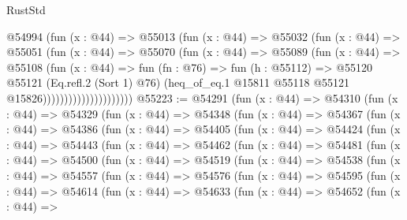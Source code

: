 \begin{lexlean}{RustStd}
\begin{coremodule}
                            @54994
                              (fun (x : @44) =>
                              @55013
                                (fun (x : @44) =>
                                @55032
                                  (fun (x : @44) =>
                                  @55051
                                    (fun (x : @44) =>
                                    @55070
                                      (fun (x : @44) =>
                                      @55089
                                        (fun (x : @44) =>
                                        @55108
                                          (fun (x : @44) =>
                                          fun (fn : @76) =>
                                          fun (h : @55112) =>
                                          @55120
                                            @55121
                                            (Eq.refl.{2} (Sort 1) @76)
                                            (heq_of_eq.{1}
                                              @15811
                                              @55118
                                              @55121
                                              @15826)))))))))))))))))))))
@55223 := @54291
    (fun (x : @44) =>
    @54310
      (fun (x : @44) =>
      @54329
        (fun (x : @44) =>
        @54348
          (fun (x : @44) =>
          @54367
            (fun (x : @44) =>
            @54386
              (fun (x : @44) =>
              @54405
                (fun (x : @44) =>
                @54424
                  (fun (x : @44) =>
                  @54443
                    (fun (x : @44) =>
                    @54462
                      (fun (x : @44) =>
                      @54481
                        (fun (x : @44) =>
                        @54500
                          (fun (x : @44) =>
                          @54519
                            (fun (x : @44) =>
                            @54538
                              (fun (x : @44) =>
                              @54557
                                (fun (x : @44) =>
                                @54576
                                  (fun (x : @44) =>
                                  @54595
                                    (fun (x : @44) =>
                                    @54614
                                      (fun (x : @44) =>
                                      @54633
                                        (fun (x : @44) =>
                                        @54652
                                          (fun (x : @44) =>

\end{coremodule}
\end{lexlean}
